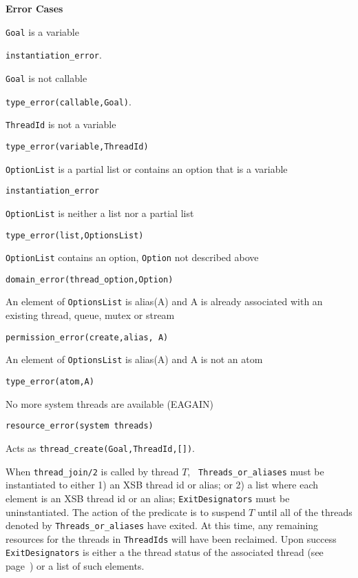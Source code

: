 \begin{description}
{\bf Error Cases}
\bi
\item 	{\tt Goal} is a variable
\bi
\item 	{\tt instantiation\_error}.
\ei
\item 	{\tt Goal} is not callable
\bi
\item 	{\tt type\_error(callable,Goal)}.
\ei
\item 	{\tt ThreadId} is not a variable
\bi
\item 	{\tt type\_error(variable,ThreadId)}
\ei
\item 	{\tt OptionList} is a partial list or contains an option that is a variable
\bi
\item 	{\tt instantiation\_error}
\ei
\item 	{\tt OptionList} is neither a list nor a partial list
\bi
\item 	{\tt type\_error(list,OptionsList)}
\ei
\item 	{\tt OptionList} contains an option, {\tt Option} not described above
\bi
\item 	{\tt domain\_error(thread\_option,Option)}
\ei
\item An element of {\tt OptionsList} is alias(A) and A is already
  associated with an existing thread, queue, mutex or stream 
\bi
\item {\tt permission\_error(create,alias, A)}
\ei
\item An element of {\tt OptionsList} is alias(A) and A is not an atom
\bi
\item {\tt type\_error(atom,A)}
\ei
\item   No more system threads are available (EAGAIN)
\bi
\item {\tt resource\_error(system threads)}
\ei
\ei

%
Acts as {\tt thread\_create(Goal,ThreadId,[])}.

% 
When {\tt thread\_join/2} is called by thread $T$, {\tt
  Threads\_or\_aliases} must be instantiated to either 1) an XSB
thread id or alias; or 2) a list where each element is an XSB thread
id or an alias; {\tt ExitDesignators} must be uninstantiated.  The
action of the predicate is to suspend $T$ until all of the threads
denoted by {\tt Threads\_or\_aliases} have exited.  At this time, any
remaining resources for the threads in {\tt ThreadIds} will have been
reclaimed.  Upon success {\tt ExitDesignators} is either a the thread
status of the associated thread (see page~\pageref{page:thread-status}) 
or a list of such elements.  


\end{description}
